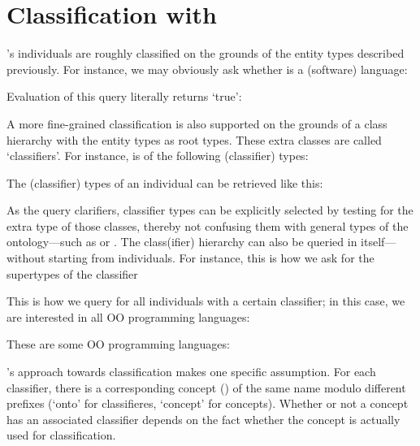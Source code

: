 
\section{Classification with \solasote}
\label{S:classify}

\solasote's individuals are roughly classified on the grounds of the entity types described previously. For instance, we may obviously ask whether  is a (software) language:


\noindent
Evaluation of this query literally returns `true':


\noindent
A more fine-grained classification is also supported on the grounds of a class hierarchy with the entity types as root types. These extra classes are called `classifiers'. For instance,  is of the following (classifier) types:


\noindent
The (classifier) types of an individual can be retrieved like this:


\noindent
As the query clarifiers, classifier types can be explicitly selected by testing for the extra type  of those classes, thereby not confusing them with general types of the ontology---such as  or . The class(ifier) hierarchy can also be queried in itself---without starting from individuals. For instance, this is how we ask for the supertypes of the classifier



\noindent
This is how we query for all individuals with a certain classifier; in this case, we are interested in all OO programming languages:


\noindent
These are some OO programming languages:


\solasote's approach towards classification makes one specific assumption.  For each classifier, there is a corresponding concept () of the same name modulo different prefixes (`onto' for classifieres, `concept' for concepts). Whether or not a concept has an associated classifier depends on the fact whether the concept is actually used for classification.

